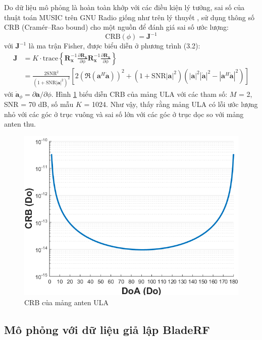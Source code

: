 Do dữ liệu mô phỏng là hoàn toàn khớp với các điều kiện lý tưởng, sai số của thuật toán MUSIC trên GNU Radio giống như trên lý thuyết \cite{Transactions1989, Quynh2015}, sử dụng thông số CRB (Cramér–Rao bound) cho một nguồn để đánh giá sai số ước lượng:
\begin{equation}
	\mathrm{CRB}(\phi) = \mathbf{J}^{-1} 
\end{equation}
với $\mathbf{J}^{-1}$ là ma trận Fisher, được biểu diễn ở phương trình (3.2):
\begin{equation}
\begin{split}
\mathbf{J} &= K \cdot \mathrm{trace} \left \{ \mathbf{R}_\mathbf{x}^{-1} \frac{\partial \mathbf{R}_\mathbf{x}}{\partial \phi} \mathbf{R}_\mathbf{x}^{-1} \frac{\partial \mathbf{R}_\mathbf{x}}{\partial \phi} \right \} \\
&= \frac{2 \mathrm{SNR}^2}{(1 + \mathrm{SNR} |\mathbf{a}|^2)^2} [2(\Re  (\mathbf{a}^{H} \dot{\mathbf{a}}))^2 + (1 + \mathrm{SNR} |\mathbf{a}|^2)(|\mathbf{a}|^2 |\dot{\mathbf{a}}|^2 - |\mathbf{a}^H \dot{\mathbf{a}}|^2)]
\end{split} 
\end{equation}
với $\dot{\mathbf{a}}_\phi = \partial\mathbf{a}/\partial\phi$. Hình \ref{fig:RMSE} biểu diễn CRB của mảng ULA với các tham số: $M$ = 2, SNR = 70 dB, số mẫu $K$ = 1024. Như vậy, thấy rằng mảng ULA có lỗi ước lượng nhỏ với các góc ở trục vuông và sai số lớn với các góc ở trục dọc so với mảng anten thu.
\begin{figure} [!h]
	\centering
	\includegraphics[width=0.64\linewidth]{figures/CRB.png}
	\caption{CRB của mảng anten ULA}
	\label{fig:RMSE}
\end{figure}

\subsection{Mô phỏng với dữ liệu giả lập BladeRF}

